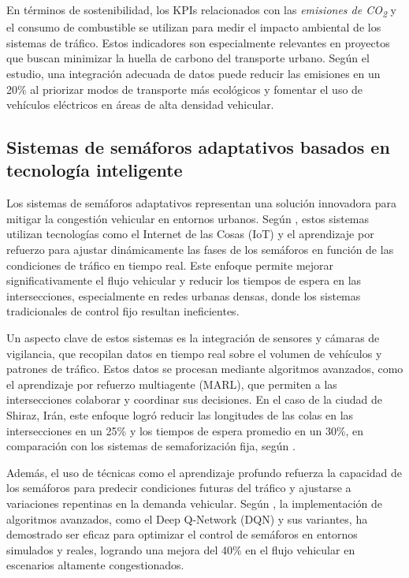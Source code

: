 En términos de sostenibilidad, los KPIs relacionados con las \textit{emisiones de CO\textsubscript{2}} y el consumo de combustible se utilizan para medir el impacto ambiental de los sistemas de tráfico. Estos indicadores son especialmente relevantes en proyectos que buscan minimizar la huella de carbono del transporte urbano. Según el estudio, una integración adecuada de datos puede reducir las emisiones en un 20\% al priorizar modos de transporte más ecológicos y fomentar el uso de vehículos eléctricos en áreas de alta densidad vehicular.

\subsection{Sistemas de semáforos adaptativos basados en tecnología inteligente}  
Los sistemas de semáforos adaptativos representan una solución innovadora para mitigar la congestión vehicular en entornos urbanos. Según \cite{Zourbakhsh2022}, estos sistemas utilizan tecnologías como el Internet de las Cosas (IoT) y el aprendizaje por refuerzo para ajustar dinámicamente las fases de los semáforos en función de las condiciones de tráfico en tiempo real. Este enfoque permite mejorar significativamente el flujo vehicular y reducir los tiempos de espera en las intersecciones, especialmente en redes urbanas densas, donde los sistemas tradicionales de control fijo resultan ineficientes.

Un aspecto clave de estos sistemas es la integración de sensores y cámaras de vigilancia, que recopilan datos en tiempo real sobre el volumen de vehículos y patrones de tráfico. Estos datos se procesan mediante algoritmos avanzados, como el aprendizaje por refuerzo multiagente (MARL), que permiten a las intersecciones colaborar y coordinar sus decisiones. En el caso de la ciudad de Shiraz, Irán, este enfoque logró reducir las longitudes de las colas en las intersecciones en un 25\% y los tiempos de espera promedio en un 30\%, en comparación con los sistemas de semaforización fija, según \cite{Zourbakhsh2022}.

Además, el uso de técnicas como el aprendizaje profundo refuerza la capacidad de los semáforos para predecir condiciones futuras del tráfico y ajustarse a variaciones repentinas en la demanda vehicular. Según \cite{Zhang2024}, la implementación de algoritmos avanzados, como el Deep Q-Network (DQN) y sus variantes, ha demostrado ser eficaz para optimizar el control de semáforos en entornos simulados y reales, logrando una mejora del 40\% en el flujo vehicular en escenarios altamente congestionados.
